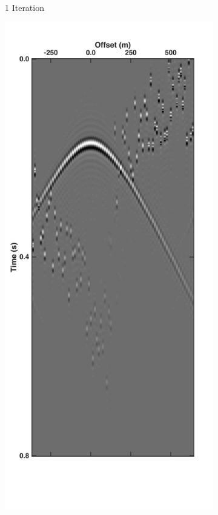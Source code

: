 \begin{figure}
\begin{subfigure}[t]{0.25\textwidth}
		\caption{1 Iteration}
		\label{fig:Ch-Theory-DeblendedCRG1}
	\end{subfigure}
	\centering
	\begin{subfigure}[t]{0.25\textwidth}
		\includegraphics[width=\textwidth]{Plots/Mahdad/5iter/DeblendedCRG_rec30}	

\end{subfigure}
\end{figure}
